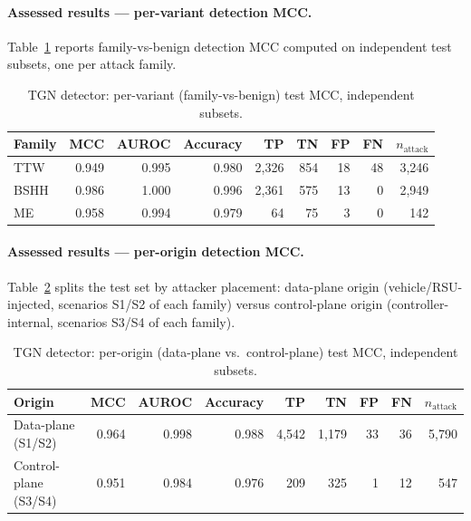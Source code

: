 \paragraph{Assessed results --- per-variant detection MCC.}
Table~\ref{tab:tgn-val2-variant-mcc} reports family-vs-benign detection MCC
computed on independent test subsets, one per attack family.

\begin{table}[htbp]
\centering
\caption{TGN detector: per-variant (family-vs-benign) test MCC, independent subsets.}
\label{tab:tgn-val2-variant-mcc}
\begin{tabular}{@{}lrrrrrrrr@{}}
\toprule
Family & MCC & AUROC & Accuracy & TP & TN & FP & FN & $n_{\text{attack}}$ \\
\midrule
TTW  & 0.949 & 0.995 & 0.980 & 2{,}326 & 854 & 18 & 48 & 3{,}246 \\
BSHH & 0.986 & 1.000 & 0.996 & 2{,}361 & 575 & 13 & 0  & 2{,}949 \\
ME   & 0.958 & 0.994 & 0.979 & 64      & 75  & 3  & 0  & 142     \\
\bottomrule
\end{tabular}
\end{table}

\paragraph{Assessed results --- per-origin detection MCC.}
Table~\ref{tab:tgn-val2-origin-mcc} splits the test set by attacker
placement: data-plane origin (vehicle/RSU-injected, scenarios S1/S2 of
each family) versus control-plane origin (controller-internal, scenarios
S3/S4 of each family).

\begin{table}[htbp]
\centering
\caption{TGN detector: per-origin (data-plane vs.\ control-plane) test MCC, independent subsets.}
\label{tab:tgn-val2-origin-mcc}
\begin{tabular}{@{}lrrrrrrrr@{}}
\toprule
Origin & MCC & AUROC & Accuracy & TP & TN & FP & FN & $n_{\text{attack}}$ \\
\midrule
Data-plane (S1/S2)    & 0.964 & 0.998 & 0.988 & 4{,}542 & 1{,}179 & 33 & 36 & 5{,}790 \\
Control-plane (S3/S4) & 0.951 & 0.984 & 0.976 & 209     & 325     & 1  & 12 & 547     \\
\bottomrule
\end{tabular}
\end{table}

